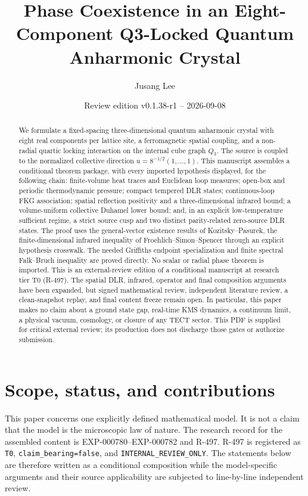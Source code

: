 \documentclass[11pt]{article}
\title{Phase Coexistence in an Eight-Component Q3-Locked Quantum Anharmonic Crystal}
\author{Jusang Lee}
\date{Review edition v0.1.38-r1 -- 2026-09-08}
\numberwithin{equation}{section}
\theoremstyle{definition}
\begin{document}
\maketitle

\begin{abstract}
We formulate a fixed-spacing three-dimensional quantum anharmonic crystal
with eight real components per lattice site, a ferromagnetic spatial coupling,
and a non-radial quartic locking interaction on the internal cube graph
$Q_3$.  The source is coupled to the normalized collective direction
$u=8^{-1/2}(1,\ldots,1)$.  This manuscript assembles a conditional theorem
package, with every imported hypothesis displayed, for the following chain:
finite-volume heat traces and Euclidean loop measures; open-box and periodic
thermodynamic pressure; compact tempered DLR states; continuous-loop FKG
association; spatial reflection positivity and a three-dimensional infrared
bound; a volume-uniform collective Duhamel lower bound; and, in an explicit
low-temperature sufficient regime, a strict source cusp and two distinct
parity-related zero-source DLR states.  The proof uses the general-vector
existence results of Kozitsky--Pasurek, the finite-dimensional infrared
inequality of Froehlich--Simon--Spencer through an explicit hypothesis
crosswalk.  The needed Griffiths endpoint specialization and finite spectral
Falk--Bruch inequality are proved directly.  No scalar or
radial phase theorem is imported.  This is an external-review edition of a conditional
manuscript at research tier T0 (R-497). The spatial DLR, infrared,
operator and final composition arguments have been expanded, but signed mathematical review,
independent literature review, a clean-snapshot replay, and final content
freeze remain open.  In particular, this paper makes no claim about a ground
state gap, real-time KMS dynamics, a continuum limit, a physical vacuum,
cosmology, or closure of any TECT sector.  This PDF is supplied for critical external review;
its production does not discharge those gates or authorize submission.
\end{abstract}

\section{Scope, status, and contributions}

This paper concerns one explicitly defined mathematical model.  It is not a
claim that the model is the microscopic law of nature.  The research record
for the assembled content is EXP-000780--EXP-000782 and R-497.  R-497 is
registered as \texttt{T0}, \texttt{claim\_bearing=false}, and
\texttt{INTERNAL\_REVIEW\_ONLY}.  The statements below are therefore written
as a conditional composition while the model-specific arguments and their
source applicability are subjected to line-by-line independent review.
\end{document}
